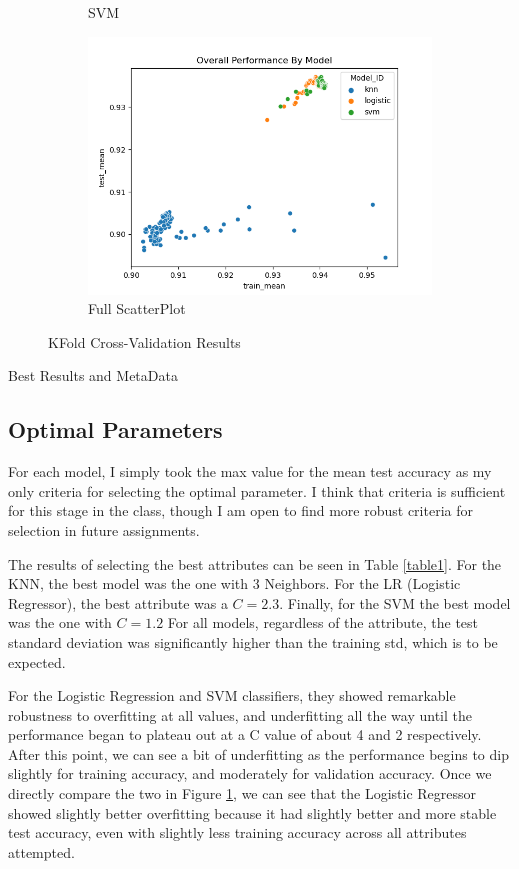 \documentclass[12pt]{article}
\begin{document}
\begin{figure}
\begin{subfigure}{.5\textwidth}
    \caption{SVM}
  \end{subfigure}%
  \begin{subfigure}{.5\textwidth}
    \includegraphics[width=.95\textwidth]{../results/Full_Scatter.png}
    \caption{Full ScatterPlot}
  \end{subfigure}
  \caption{KFold Cross-Validation Results}
  \label{figure1}
\end{figure}

\begin{table}
  \resizebox*{.95\textwidth}{!}{}
  \caption{Best Results and MetaData}
  \label{table1}
\end{table}


\subsection{Optimal Parameters}
For each model, I simply took the max value for the mean test accuracy as my only criteria for selecting the optimal 
parameter. I think that criteria is sufficient for this stage in the class, though I am open to find more robust criteria 
for selection in future assignments.

The results of selecting the best attributes can be seen in Table \ref{table1}. For the KNN, the best model was the one with 3
Neighbors. For the  LR (Logistic Regressor), the best attribute was a $C=2.3$. Finally, for the SVM the best model was the one
with $C=1.2$ For all models, regardless of the attribute, the test standard deviation was significantly higher than the 
training std, which is to be expected.

For the Logistic Regression and SVM classifiers, they showed remarkable robustness to overfitting at all values, and underfitting
all the way until the performance began
to plateau out at a C value of about 4 and 2 respectively. After this point, we can see a bit of underfitting as the performance 
begins to dip slightly for training accuracy, and moderately for validation accuracy. Once we directly compare the two in Figure \ref{figure1}, we can see
that the Logistic Regressor showed slightly better overfitting because it had slightly better and more stable test accuracy, even with 
slightly less training accuracy across all attributes attempted.
\end{document}

